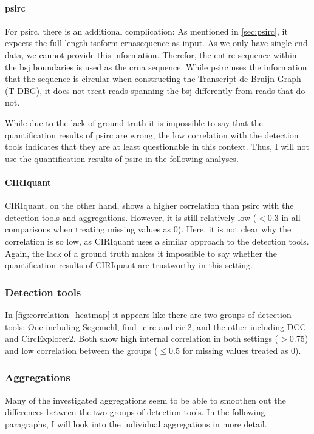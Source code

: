 \paragraph{psirc}
For psirc, there is an additional complication: As mentioned in
\cref{sec:psirc}, it expects the full-length isoform \glspl{crna}equence as
input.
As we only have single-end data, we cannot provide this information.
Therefor, the entire sequence within the \gls{bsj} boundaries is used as the
\gls{crna} sequence.
While psirc uses the information that the sequence is circular when
constructing the Transcript de Bruijn Graph (T-DBG), it does not treat reads
spanning the \gls{bsj} differently from reads that do
not\supercite{yu_quantifying_2021}.

While due to the lack of ground truth it is impossible to say that the
quantification results of psirc are wrong, the low correlation with the
detection tools indicates that they are at least questionable in this context.
Thus, I will not use the quantification results of psirc in the following
analyses.

\paragraph{CIRIquant}
CIRIquant, on the other hand, shows a higher correlation than psirc with the
detection tools and aggregations.
However, it is still relatively low ($<$0.3 in all comparisons when treating
missing values as 0).
Here, it is not clear why the correlation is so low, as CIRIquant uses a
similar approach to the detection tools.
Again, the lack of a ground truth makes it impossible to say whether the
quantification results of CIRIquant are trustworthy in this setting.

\subsubsection{Detection tools}
In \cref{fig:correlation_heatmap} it appears like there are two groups of
detection tools: One including Segemehl, find\_circ and ciri2, and the other
including DCC and CircExplorer2.
Both show high internal correlation in both settings ($>$0.75) and low
correlation between the groups ($\leq$0.5 for missing values treated as 0).


\subsubsection{Aggregations}
Many of the investigated aggregations seem to be able to smoothen out the
differences between the two groups of detection tools.
In the following paragraphs, I will look into the individual aggregations in
more detail.

